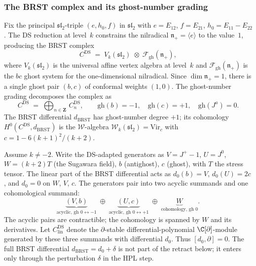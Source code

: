 \subsubsection*{The BRST complex and its ghost-number grading}

Fix the principal $\mathfrak{sl}_2$-triple $(e, h_0, f)$ in
$\mathfrak{sl}_2$ with $e = E_{12}$, $f = E_{21}$,
$h_0 = E_{11} - E_{22}$. The DS reduction at level~$k$
constrains the nilradical $\mathfrak{n}_+
= \langle e \rangle$ to the value~$1$, producing the
BRST complex
\begin{equation}\label{eq:ds-brst-complex}
C^{\mathrm{DS}}
\;=\;
V_k(\mathfrak{sl}_2)
\;\otimes\;
\mathcal{F}_{\mathrm{gh}}(\mathfrak{n}_+),
\end{equation}
where $V_k(\mathfrak{sl}_2)$ is the universal affine vertex
algebra at level~$k$ and
$\mathcal{F}_{\mathrm{gh}}(\mathfrak{n}_+)$ is the $bc$
ghost system for the one-dimensional nilradical. Since
$\dim\mathfrak{n}_+ = 1$, there is a single ghost pair
$(b, c)$ of conformal weights $(1, 0)$. The ghost-number
grading decomposes the complex as
\[
C^{\mathrm{DS}}
\;=\;
\bigoplus_{n \in \mathbf{Z}}\,C^{\mathrm{DS}}_n,
\qquad
\mathrm{gh}(b) = -1,
\quad
\mathrm{gh}(c) = +1,
\quad
\mathrm{gh}(J^a) = 0.
\]
The BRST differential $d_{\mathrm{BRST}}$ has ghost-number
degree $+1$; its cohomology
$H^0(C^{\mathrm{DS}}, d_{\mathrm{BRST}})$ is the
$\mathcal{W}$-algebra $\mathcal{W}_k(\mathfrak{sl}_2)
= \mathrm{Vir}_c$ with $c = 1 - 6(k+1)^2/(k+2)$.

Assume \(k\ne -2\).  Write the DS-adapted generators as
$V = J^+ - 1$, $U = J^0$, $W = (k+2)T$ (the Sugawara field),
$b$ (antighost), $c$ (ghost), with $T$ the stress tensor.
The linear part of the BRST differential acts as $d_0(b) = V$,
$d_0(U) = 2c$, and $d_0 = 0$ on $W$, $V$, $c$. The generators
pair into two acyclic summands and one cohomological summand:
\[
\underbrace{(V, b)}_{\text{acyclic, gh }0 \leftrightarrow -1}
\;\oplus\;
\underbrace{(U, c)}_{\text{acyclic, gh }0 \leftrightarrow +1}
\;\oplus\;
\underbrace{W}_{\text{cohomology, gh }0}.
\]
The acyclic pairs are contractible; the cohomology is spanned
by $W$ and its derivatives.
Let \(C^{\mathrm{DS}}_{\mathrm{lin}}\) denote the
\(\partial\)-stable differential-polynomial \(\C[\partial]\)-module
generated by these three summands with differential \(d_0\).  Thus
\([d_0,\partial]=0\).  The full BRST differential
\(d_{\mathrm{BRST}}=d_0+\delta\) is not part of the retract below; it
enters only through the perturbation \(\delta\) in the HPL step.

